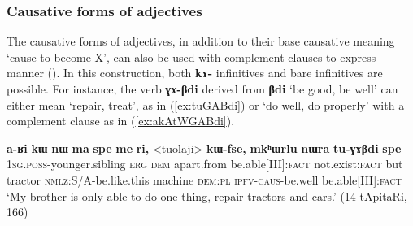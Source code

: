 \documentclass[oneside,a4paper,11pt]{article}
\newcommand{\ipa}[1]{\textbf{\phon#1}} %
\newcommand{\jpg}[2]{\ipa{#1} `#2'} %
\newcommand{\refb}[1]{(\ref{#1})}
\begin{document}
 
% 
%

\subsubsection{Causative forms of adjectives} \label{sec:adj.caus}
The causative forms of adjectives, in addition to their base causative meaning `cause to become X', can also be used with complement clauses to express manner (\citealt[184]{jacques15causative}). In this construction, both  \ipa{kɤ-} infinitives and bare infinitives are possible. For instance, the verb \ipa{ɣɤ-βdi} derived from \jpg{βdi}{be good, be well} can either mean `repair, treat', as in \refb{ex:tuGABdi} or `do well, do properly' with a complement clause as in \refb{ex:akAtWGABdi}.

\begin{exe}
\ex \label{ex:tuGABdi}
 \gll \ipa{a-ʁi} 	\ipa{kɯ} 	\ipa{nɯ} 	\ipa{ma} 	\ipa{spe} 	\ipa{me} 	\ipa{ri,} 	<tuolaji> 	\ipa{kɯ-fse,} 	\ipa{mkʰɯrlu} 	\ipa{nɯra} 	\ipa{tu-ɣɤβdi} 	\ipa{spe} \\
 \textsc{1sg.poss}-younger.sibling \textsc{erg} \textsc{dem} apart.from be.able[III]:\textsc{fact} not.exist:\textsc{fact} but tractor \textsc{nmlz}:S/A-be.like.this machine \textsc{dem:pl} \textsc{ipfv-caus}-be.well be.able[III]:\textsc{fact} \\
 \glt `My brother is only able to do one thing, repair tractors and cars.' (14-tApitaRi, 166)
\end{exe}
\end{document}
